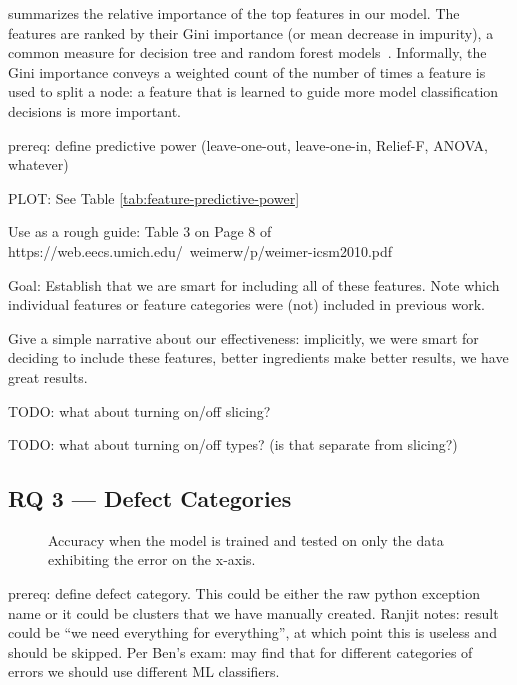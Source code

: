 \documentclass[conference]{IEEEtran}
\begin{document}
 summarizes the relative importance
of the top features in our model. The features are ranked by their
Gini importance (or mean decrease in impurity), a common measure
for decision tree and random forest models~\cite{FIXME}. Informally, the
Gini importance conveys a weighted count of the number of times a feature
is used to split a node: a feature that is learned to guide more model
classification decisions is more important.

prereq: define predictive power (leave-one-out, leave-one-in, Relief-F,
ANOVA, whatever)

PLOT: See Table \ref{tab:feature-predictive-power}

Use as a rough guide: Table 3 on Page 8 of
https://web.eecs.umich.edu/~weimerw/p/weimer-icsm2010.pdf

Goal: Establish that we are smart for including all of these features. Note
which individual features or feature categories were (not) included in
previous work.

Give a simple narrative about our effectiveness: implicitly, we were smart
for deciding to include these features, better ingredients make better
results, we have great results.

TODO: what about turning on/off slicing?

TODO: what about turning on/off types? (is that separate from slicing?)

\subsection{RQ 3 --- Defect Categories}

\begin{figure}
\caption{Accuracy when the model is trained and tested on only the data exhibiting
the error on the x-axis.}
\label{fig:defect-categories}
\end{figure}

prereq: define defect category. This could be either the raw python
exception name or it could be clusters that we have manually created.
Ranjit notes: result could be ``we need everything for everything'', at
which point this is useless and should be skipped. Per Ben's exam: may find
that for different categories of errors we should use different ML
classifiers.
\end{document}
